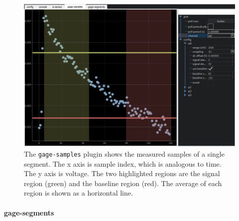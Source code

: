 \begin{landscape}
\begin{figure}
\includegraphics[width=8in]{"yaq/images/gage_samples_ai0"}
\caption[\yaqcqtpy{} Gage DAQ Plugin (samples)]{
	The \texttt{gage-samples} plugin shows the measured samples of a single segment.
	The x axis is sample index, which is analogous to time.
	The y axis is voltage.
	The two highlighted regions are the signal region (green) and the baseline region (red).
	The average of each region is shown as a horizontal line.
}
\label{yaq:fig:gage_samples_ai0}
\end{figure}
\end{landscape}



\paragraph{gage-segments}

